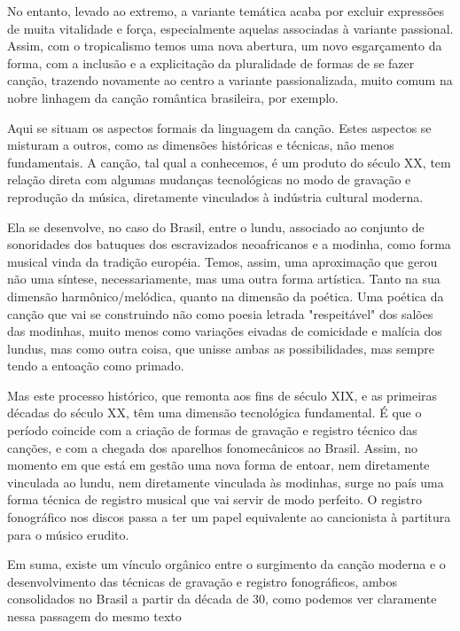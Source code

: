 No entanto, levado ao extremo, a variante temática acaba por excluir
expressões de muita vitalidade e força, especialmente aquelas associadas
à variante passional. Assim, com o tropicalismo temos uma nova abertura,
um novo esgarçamento da forma, com a inclusão e a explicitação da
pluralidade de formas de se fazer canção, trazendo novamente ao centro a
variante passionalizada, muito comum na nobre linhagem da canção
romântica brasileira, por exemplo.

Aqui se situam os aspectos formais da linguagem da canção. Estes
aspectos se misturam a outros, como as dimensões históricas e técnicas,
não menos fundamentais. A canção, tal qual a conhecemos, é um produto do
século XX, tem relação direta com algumas mudanças tecnológicas no modo
de gravação e reprodução da música, diretamente vinculados à indústria
cultural moderna.

Ela se desenvolve, no caso do Brasil, entre o lundu, associado ao
conjunto de sonoridades dos batuques dos escravizados neoafricanos e a
modinha, como forma musical vinda da tradição européia. Temos, assim,
uma aproximação que gerou não uma síntese, necessariamente, mas uma
outra forma artística. Tanto na sua dimensão harmônico/melódica, quanto
na dimensão da poética. Uma poética da canção que vai se construindo não
como poesia letrada "respeitável" dos salões das modinhas, muito menos
como variações eivadas de comicidade e malícia dos lundus, mas como
outra coisa, que unisse ambas as possibilidades, mas sempre tendo a
entoação como primado.

Mas este processo histórico, que remonta aos fins de século XIX, e as
primeiras décadas do século XX, têm uma dimensão tecnológica
fundamental. É que o período coincide com a criação de formas de
gravação e registro técnico das canções, e com a chegada dos aparelhos
fonomecânicos ao Brasil. Assim, no momento em que está em gestão uma
nova forma de entoar, nem diretamente vinculada ao lundu, nem
diretamente vinculada às modinhas, surge no país uma forma técnica de
registro musical que vai servir de modo perfeito. O registro fonográfico
nos discos passa a ter um papel equivalente ao cancionista à partitura
para o músico erudito.

Em suma, existe um vínculo orgânico entre o surgimento da canção moderna
e o desenvolvimento das técnicas de gravação e registro fonográficos,
ambos consolidados no Brasil a partir da década de 30, como podemos ver
claramente nessa passagem do mesmo texto

